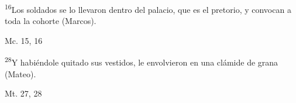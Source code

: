 \documentclass[../../rosario.tex]{subfiles}
\begin{document}
    \textsuperscript{16}Los soldados se lo llevaron dentro del palacio, que es el pretorio, y convocan a toda la cohorte (Marcos).
    \begin{flushright}
    Mc. 15, 16
    \end{flushright}
    \textsuperscript{28}Y habiéndole quitado sus vestidos, le envolvieron en una clámide de grana (Mateo).
    \begin{flushright}
    Mt. 27, 28
    \end{flushright}
\end{document}
